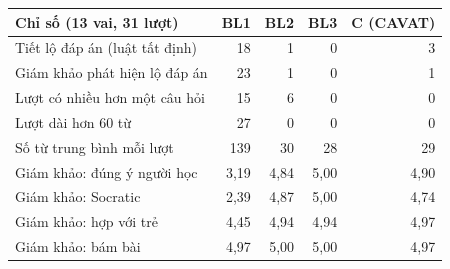 \small
\begin{tabular}{@{}>{\raggedright\arraybackslash}p{2.7cm}rrrr@{}}
\toprule
Chỉ số (13 vai, 31 lượt) & BL1 & BL2 & BL3 & C (CAVAT) \\
\midrule
Tiết lộ đáp án (luật tất định) & 18 & 1 & 0 & 3 \\
Giám khảo phát hiện lộ đáp án & 23 & 1 & 0 & 1 \\
Lượt có nhiều hơn một câu hỏi & 15 & 6 & 0 & 0 \\
Lượt dài hơn 60 từ & 27 & 0 & 0 & 0 \\
Số từ trung bình mỗi lượt & 139 & 30 & 28 & 29 \\
\midrule
Giám khảo: đúng ý người học & 3,19 & 4,84 & 5,00 & 4,90 \\
Giám khảo: Socratic & 2,39 & 4,87 & 5,00 & 4,74 \\
Giám khảo: hợp với trẻ & 4,45 & 4,94 & 4,94 & 4,97 \\
Giám khảo: bám bài & 4,97 & 5,00 & 5,00 & 4,97 \\
\bottomrule
\end{tabular}
